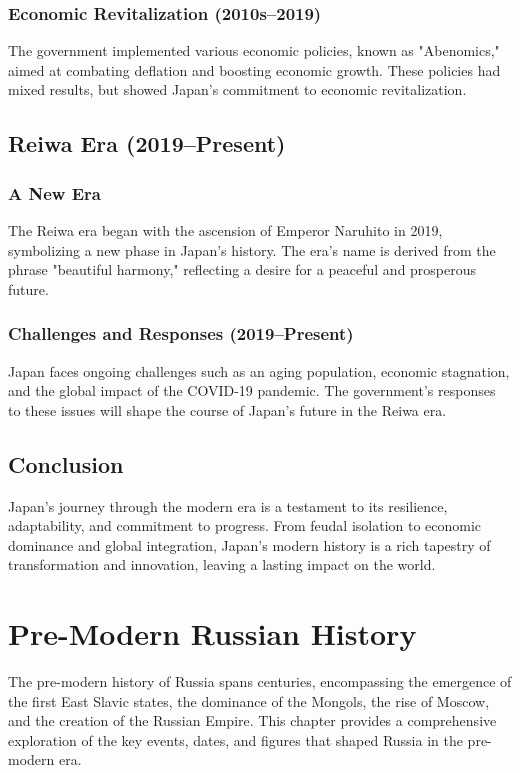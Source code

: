 \documentclass[a4paper,12pt]{book}
\begin{document}
\subsection{Economic Revitalization (2010s–2019)}
The government implemented various economic policies, known as "Abenomics," aimed at combating deflation and boosting economic growth. These policies had mixed results, but showed Japan’s commitment to economic revitalization.

\section{Reiwa Era (2019–Present)}
\label{sec:reiwa-era}
\subsection{A New Era}
The Reiwa era began with the ascension of Emperor Naruhito in 2019, symbolizing a new phase in Japan’s history. The era's name is derived from the phrase "beautiful harmony," reflecting a desire for a peaceful and prosperous future.

\subsection{Challenges and Responses (2019–Present)}
Japan faces ongoing challenges such as an aging population, economic stagnation, and the global impact of the COVID-19 pandemic. The government’s responses to these issues will shape the course of Japan’s future in the Reiwa era.

\section{Conclusion}
\label{sec:conclusion-modern-japan}
Japan’s journey through the modern era is a testament to its resilience, adaptability, and commitment to progress. From feudal isolation to economic dominance and global integration, Japan’s modern history is a rich tapestry of transformation and innovation, leaving a lasting impact on the world.

\chapter{Pre-Modern Russian History}
\label{ch:pre-modern-russian-history}

The pre-modern history of Russia spans centuries, encompassing the emergence of the first East Slavic states, the dominance of the Mongols, the rise of Moscow, and the creation of the Russian Empire. This chapter provides a comprehensive exploration of the key events, dates, and figures that shaped Russia in the pre-modern era.
\end{document}

